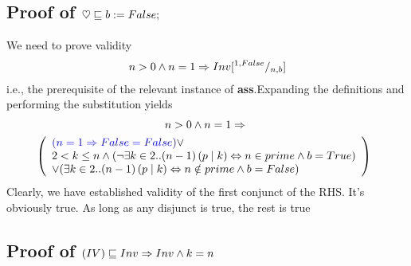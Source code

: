 \documentclass[headings=small,a4paper,12pt]{scrartcl}
\begin{document}
\subsection{Proof of $\heartsuit \sqsubseteq {b \mathrel{:=}False}; $}
\label{sec:proofheartAss}

We need to prove validity
\begin{gather*}
  n > 0 \wedge n =1 \Rightarrow Inv[^{1,False}/_{n,b}] 
\end{gather*}
i.e., the prerequisite of the relevant instance of \textbf{ass}.Expanding the definitions and performing the substitution yields
\begin{gather*}
	n>0 \wedge n = 1\Rightarrow{}\\
	\left(
  \begin{array}{l}
  {\color{blue}(n = 1 \Rightarrow False = False )} \vee\\
2< k \leq n \wedge (\neg\exists k \in 2..(n-1)\left( p \mid k\right)\Leftrightarrow n \in prime\wedge b = True)\\
\vee (\exists k \in 2..(n-1)\left(p \mid k\right)\Leftrightarrow n \notin prime\wedge b = False)\\
 	\end{array}
	\right)\enskip
\end{gather*}
Clearly, we have established validity of the {\color{blue}first conjunct} of the RHS. It's obviously true. As long as any disjunct is true, the rest is true


\subsection{Proof of $(IV)\sqsubseteq Inv\Rightarrow Inv\wedge k = n$}
\label{sec:proofIVs-post}
\end{document}
